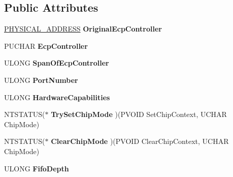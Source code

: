 \subsection*{Public Attributes}
\begin{DoxyCompactItemize}
\item 
\hypertarget{struct__PARALLEL__PNP__INFORMATION_ac8888f5cb9f1b3398f7fa753d35a453e}{}\hyperlink{union__LARGE__INTEGER}{P\+H\+Y\+S\+I\+C\+A\+L\+\_\+\+A\+D\+D\+R\+E\+S\+S} {\bfseries Original\+Ecp\+Controller}\label{struct__PARALLEL__PNP__INFORMATION_ac8888f5cb9f1b3398f7fa753d35a453e}

\item 
\hypertarget{struct__PARALLEL__PNP__INFORMATION_ab2cd042e2b844ec4d1bfd60221c6cfdc}{}P\+U\+C\+H\+A\+R {\bfseries Ecp\+Controller}\label{struct__PARALLEL__PNP__INFORMATION_ab2cd042e2b844ec4d1bfd60221c6cfdc}

\item 
\hypertarget{struct__PARALLEL__PNP__INFORMATION_a1b1093a309f25031e82dea14b51129b0}{}U\+L\+O\+N\+G {\bfseries Span\+Of\+Ecp\+Controller}\label{struct__PARALLEL__PNP__INFORMATION_a1b1093a309f25031e82dea14b51129b0}

\item 
\hypertarget{struct__PARALLEL__PNP__INFORMATION_a7c7ef4e77c86beb2a5bf18177b1125df}{}U\+L\+O\+N\+G {\bfseries Port\+Number}\label{struct__PARALLEL__PNP__INFORMATION_a7c7ef4e77c86beb2a5bf18177b1125df}

\item 
\hypertarget{struct__PARALLEL__PNP__INFORMATION_a0ab046ef56c24be1fb2ec1b58f99f73e}{}U\+L\+O\+N\+G {\bfseries Hardware\+Capabilities}\label{struct__PARALLEL__PNP__INFORMATION_a0ab046ef56c24be1fb2ec1b58f99f73e}

\item 
\hypertarget{struct__PARALLEL__PNP__INFORMATION_abab923577123d146ec67a7cf6434c955}{}N\+T\+S\+T\+A\+T\+U\+S($\ast$ {\bfseries Try\+Set\+Chip\+Mode} )(P\+V\+O\+I\+D Set\+Chip\+Context, U\+C\+H\+A\+R Chip\+Mode)\label{struct__PARALLEL__PNP__INFORMATION_abab923577123d146ec67a7cf6434c955}

\item 
\hypertarget{struct__PARALLEL__PNP__INFORMATION_ad3d477b8d889d3d580b9274a8c86dac1}{}N\+T\+S\+T\+A\+T\+U\+S($\ast$ {\bfseries Clear\+Chip\+Mode} )(P\+V\+O\+I\+D Clear\+Chip\+Context, U\+C\+H\+A\+R Chip\+Mode)\label{struct__PARALLEL__PNP__INFORMATION_ad3d477b8d889d3d580b9274a8c86dac1}

\item 
\hypertarget{struct__PARALLEL__PNP__INFORMATION_a43bdddbea07af3281822cab0e0365e33}{}U\+L\+O\+N\+G {\bfseries Fifo\+Depth}\label{struct__PARALLEL__PNP__INFORMATION_a43bdddbea07af3281822cab0e0365e33}


\end{DoxyCompactItemize}
